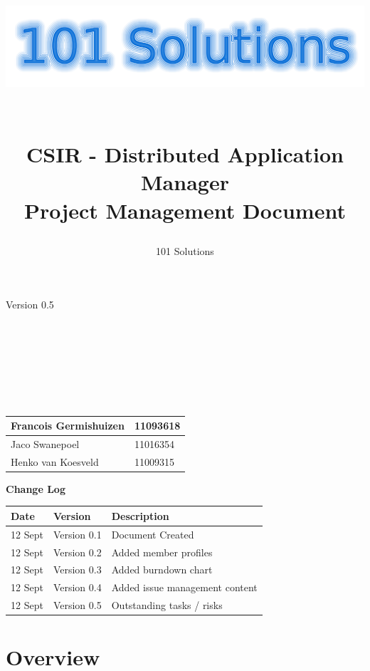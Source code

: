 \documentclass[a4paper,12pt,final]{article}
\title{
\begin{center}
  	\includegraphics[scale=0.3]{101Logo.png} 
  \end{center}
  \textbf{\\}
CSIR - Distributed Application Manager\\
Project Management Document\\
}
\author{101 Solutions}
\begin{document}
\maketitle
\begin{center}
Version 0.5
\end{center}
\textbf{\\}
\textbf{\\}
\textbf{\\}
\textbf{\\}
\textbf{\\}
\textbf{\\}
\begin{center}
\begin{tabular}{|l|l|}
\hline
Francois Germishuizen & 11093618\\
\hline
Jaco Swanepoel & 11016354\\
\hline
Henko van Koesveld & 11009315\\
\hline
\end{tabular}
\end{center}
\thispagestyle{empty}
\newpage
\thispagestyle{empty}
\textbf{\large{Change Log}}
\vspace{6pt}\newline
\begin{tabular}{|l|l|l|}
\hline
Date & Version & Description\\
\hline
12 Sept & Version 0.1 & Document Created\\
\hline
12 Sept & Version 0.2 & Added member profiles\\
\hline
12 Sept & Version 0.3 & Added burndown chart\\
\hline
12 Sept & Version 0.4 & Added issue management content\\
\hline
12 Sept & Version 0.5 & Outstanding tasks / risks\\
\hline
\end{tabular}
\newpage
\tableofcontents
\thispagestyle{empty}
\newpage

\section{Overview}
\end{document}
